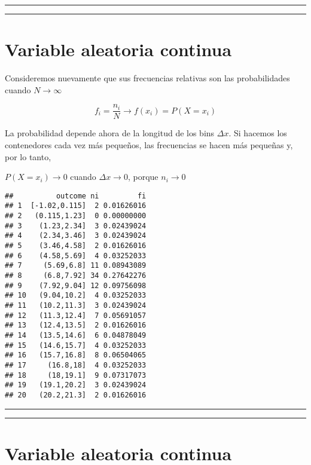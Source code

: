 \documentclass[
]{book}
\begin{document}
\begin{center}\rule{0.5\linewidth}{0.5pt}\end{center}

\begin{center}\rule{0.5\linewidth}{0.5pt}\end{center}

\hypertarget{variable-aleatoria-continua-1}{%
\section{Variable aleatoria continua}\label{variable-aleatoria-continua-1}}

Consideremos nuevamente que sus frecuencias relativas son las probabilidades cuando \(N \rightarrow \infty\)

\[f_i=\frac{n_i}{N} \rightarrow f(x_i)=P(X=x_i)\]

La probabilidad depende ahora de la longitud de los bins \(\Delta x\). Si hacemos los contenedores cada vez más pequeños, las frecuencias se hacen más pequeñas y, por lo tanto,

\(P(X=x_i) \rightarrow 0\) cuando \(\Delta x \rightarrow 0\), porque \(n_i \rightarrow 0\)

\begin{verbatim}
##          outcome ni         fi
## 1  [-1.02,0.115]  2 0.01626016
## 2   (0.115,1.23]  0 0.00000000
## 3    (1.23,2.34]  3 0.02439024
## 4    (2.34,3.46]  3 0.02439024
## 5    (3.46,4.58]  2 0.01626016
## 6    (4.58,5.69]  4 0.03252033
## 7     (5.69,6.8] 11 0.08943089
## 8     (6.8,7.92] 34 0.27642276
## 9    (7.92,9.04] 12 0.09756098
## 10   (9.04,10.2]  4 0.03252033
## 11   (10.2,11.3]  3 0.02439024
## 12   (11.3,12.4]  7 0.05691057
## 13   (12.4,13.5]  2 0.01626016
## 14   (13.5,14.6]  6 0.04878049
## 15   (14.6,15.7]  4 0.03252033
## 16   (15.7,16.8]  8 0.06504065
## 17     (16.8,18]  4 0.03252033
## 18     (18,19.1]  9 0.07317073
## 19   (19.1,20.2]  3 0.02439024
## 20   (20.2,21.3]  2 0.01626016
\end{verbatim}

\begin{center}\rule{0.5\linewidth}{0.5pt}\end{center}

\begin{center}\rule{0.5\linewidth}{0.5pt}\end{center}

\hypertarget{variable-aleatoria-continua-2}{%
\section{Variable aleatoria continua}\label{variable-aleatoria-continua-2}}
\end{document}

